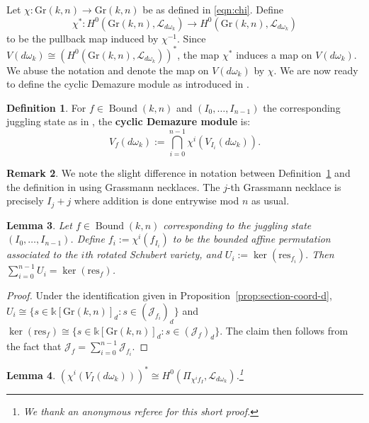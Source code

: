 \documentclass[12pt,reqno]{amsart}
\newtheorem{lemma}{Lemma}[section]
\theoremstyle{definition}
\newtheorem{definition}[lemma]{Definition}
\newtheorem{remark}[lemma]{Remark}
\renewcommand{\k}{\mathbb{k}}
\newcommand{\cJ}{\mathcal{J}}
\newcommand{\res}{\mathrm{res}}
\newcommand{\gr}{\mathrm{Gr}}
\newcommand{\bound}{\operatorname{Bound}}
\begin{document}
{Let $\chi:\gr(k,n)\rightarrow \gr(k,n)$ be as defined in \eqref{eqn:chi}. Define 
\[\chi^*: H^0(\gr(k,n),\mathcal{L}_{d\omega_k}) \rightarrow H^0(\gr(k,n),\mathcal{L}_{d\omega_k})\]
to be the pullback map induced by $\chi^{-1}$. 
Since $V(d\omega_k)\cong (H^0(\gr(k,n),\mathcal{L}_{d\omega_k}))^*$, the map $\chi^*$ induces a map on $V(d\omega_k)$. We abuse the notation and denote the map on $V(d\omega_k)$ by $\chi$. We are now ready to define the cyclic Demazure module as introduced in \cite{Lam19}.
\begin{definition}\label{def:cyclicdemazure}
    For $f\in \bound(k,n)$ and $(I_0,\dots, I_{n-1})$ the corresponding juggling state as in , the \textbf{cyclic Demazure module} is:
    \begin{equation}
        V_f(d\omega_k) := \bigcap_{i = 0}^{n-1} \chi^i(V_{I_i}(d\omega_k)).
    \end{equation}
\end{definition}
\begin{remark}
    We note the slight difference in notation between Definition~\ref{def:cyclicdemazure} and the definition in \cite{Lam19} using Grassmann necklaces.
    The $j$-th Grassmann necklace is precisely $I_j+j$ where addition is done entrywise mod $n$ as usual. 
\end{remark}

\begin{lemma}
\label{lem:kerres}
    Let $f\in \bound(k,n)$ corresponding to the juggling state $(I_0,\dots, I_{n-1})$. Define $f_i:=\chi^i(f_{I_i})$ to be the bounded affine permutation associated to the $i$th rotated Schubert variety, and $U_i:=\ker(\res_{f_i}).$ Then $\sum_{i=0}^{n-1} U_i=\ker(\res_{f})$. 
\end{lemma}


\begin{proof}
    Under the identification given in Proposition~\ref{prop:section-coord-d}, $U_i\cong \{s\in \k[\gr(k,n)]_d : s\in (\cJ_{f_i})_d\}$ and $\ker(\res_f)\cong \{s\in\k[\gr(k,n)]_d: s\in (\cJ_{f})_d\}$. The claim then follows from the fact that $\cJ_f=\sum_{i=0}^{n-1}{\cJ}_{f_i}$.
\end{proof}

\begin{lemma}\label{lemma:rotatedSchub}
    $(\chi^i(V_{I}(d\omega_k)))^* \cong H^0(\Pi_{\chi^i f_I},\mathcal{L}_{d\omega_k})$.\footnote{We thank an anonymous referee for this short proof.}
\end{lemma}

}
\end{document}
